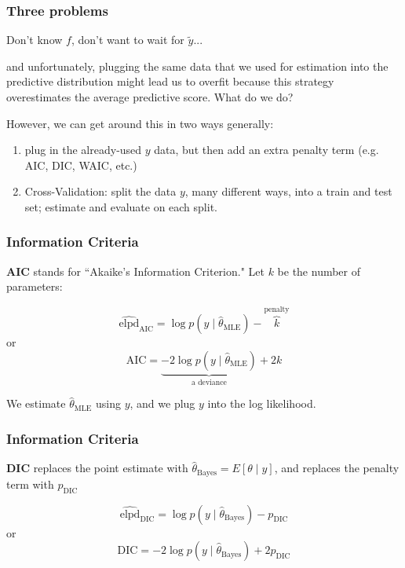 \documentclass{beamer}
\begin{document}
\begin{frame}
\frametitle{Three problems}

Don't know $f$, don't want to wait for $\tilde{y}$...
\newline

and unfortunately, plugging the same data that we used for estimation into the predictive distribution might lead us to overfit because this strategy overestimates the average predictive score. What do we do?
\newline
\pause

However, we can get around this in two ways generally:
\begin{enumerate}
\item plug in the already-used $y$ data, but then add an extra penalty term (e.g. AIC, DIC, WAIC, etc.)
\item Cross-Validation: split the data $y$, many different ways, into a train and test set; estimate and evaluate on each split.
\end{enumerate}

\end{frame}

\begin{frame}
\frametitle{Information Criteria}

{\bf AIC} stands for ``Akaike's Information Criterion." Let $k$ be the number of parameters:
\newline

\[
\widehat{\text{elpd}}_{\text{AIC}} = \log p(y \mid \hat{\theta}_{\text{MLE}}) - \overbrace{k}^{\text{penalty}}
\]
or
\[
\text{AIC} = \underbrace{-2\log p(y \mid \hat{\theta}_{\text{MLE}})}_{\text{a deviance}} +2 k
\]

We estimate $\hat{\theta}_{\text{MLE}}$ using $y$, \*and\* we plug $y$ into the log likelihood. 

\end{frame}


\begin{frame}
\frametitle{Information Criteria}

{\bf DIC} replaces the point estimate with $\hat{\theta}_{\text{Bayes}} = E[\theta \mid y]$, and replaces the penalty term with $p_{\text{DIC}}$
\newline

\[
\widehat{\text{elpd}}_{\text{DIC}} = \log p(y \mid \hat{\theta}_{\text{Bayes}}) - p_{\text{DIC}}
\]
or
\[
\text{DIC} = -2\log p(y \mid \hat{\theta}_{\text{Bayes}}) +2 p_{\text{DIC}}
\]

\end{frame}
\end{document}
